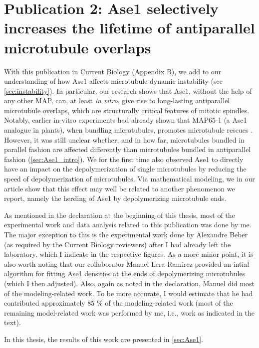 \section{Publication 2: Ase1 selectively increases the lifetime of antiparallel microtubule overlaps}
With this publication in Current Biology \parencite{Krattenmacher2024} (Appendix B), we add to our understanding of how Ase1 affects microtubule dynamic instability (see \autoref{sec:instability}). In particular, our research shows that Ase1, without the help of any other MAP, can, at least \textit{in vitro}, give rise to long-lasting antiparallel microtubule overlaps, which are structurally critical features of mitotic spindles. Notably, earlier in-vitro experiments had already shown that MAP65-1 (a Ase1 analogue in plants), when bundling microtubules, promotes microtubule rescues \parencite{Stoppin-Mellet2013}. However, it was still unclear whether, and in how far, microtubules bundled in parallel fashion are affected differently than microtubules bundled in antiparallel fashion (\autoref{sec:Ase1_intro}). We for the first time also observed Ase1 to directly have an impact on the depolymerization of single microtubules by reducing the speed of depolymerization of microtubules. Via mathematical modeling, we in our article show that this effect may well be related to another phenomenon we report, namely the herding of Ase1 by depolymerizing microtubule ends. \par

As mentioned in the declaration at the beginning of this thesis, most of the experimental work and data analysis related to this publication was done by me. The major exception to this is the experimental work done by Alexandre Beber (as required by the Current Biology reviewers) after I had already left the laboratory, which I indicate in the respective figures. As a more minor point, it is also worth noting that our collaborator Manuel Lera Ramirez provided an intial algorithm for fitting Ase1 densities at the ends of depolymerizing microtubules (which I then adjusted). Also, again as noted in the declaration, Manuel did most of the modeling-related work. To be more accurate, I would estimate that he had contributed approximately 85 \% of the modeling-related work (most of the remaining model-related work was performed by me, i.e., work as indicated in the text).\par

In this thesis, the results of this work are presented in \autoref{sec:Ase1}.
